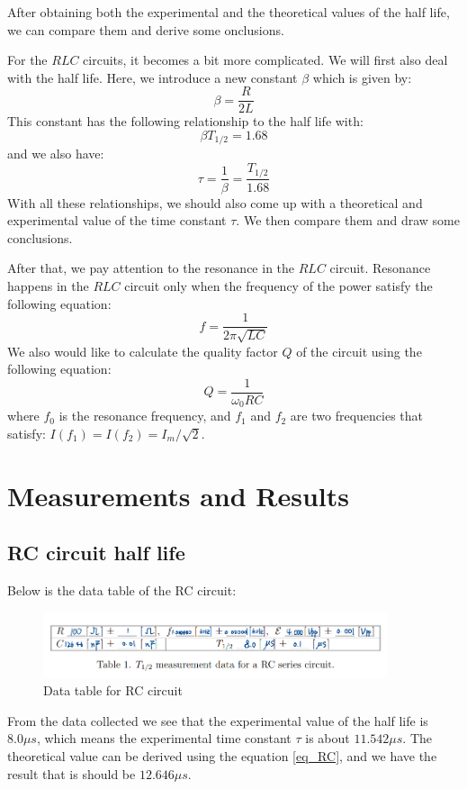 \documentclass[12pt, a4paper, oneside]{article}
\begin{document}
After obtaining both the experimental and the theoretical values of the half life, we can compare them and derive some onclusions. 

For the $RLC$ circuits, it becomes a bit more complicated. We will first also deal with the half life. Here, we introduce a new 
constant $\beta$ which is given by:
\begin{equation}
	\beta=\frac{R}{2L}
\end{equation}
This constant has the following relationship to the half life with:
\begin{equation}
	\beta T_{1/2}=1.68
\end{equation}
and we also have:
\begin{equation}
	\tau=\frac{1}{\beta}=\frac{T_{1/2}}{1.68}
	\label{eq_RLC}
\end{equation}
With all these relationships, we should also come up with a theoretical and experimental value of the time constant $\tau$. We then
compare them and draw some conclusions. 

After that, we pay attention to the resonance in the $RLC$ circuit. Resonance happens in the $RLC$ circuit only when the 
frequency of the power satisfy the following equation:
\begin{equation}
	f=\frac{1}{2\pi\sqrt{LC}}
	\label{eq_fre}
\end{equation}
We also would like to calculate the quality factor $Q$ of the circuit using the following equation:
\begin{equation}
	Q=\frac{1}{\omega_0 RC}
	\label{eq_Q}
\end{equation}
where $f_0$ is the resonance frequency, and $f_1$ and $f_2$ are two frequencies that satisfy: $I(f_1)=I(f_2)=I_m/\sqrt{2}$.

\section{Measurements and Results}
\subsection{RC circuit half life}
\indent

Below is the data table of the RC circuit:
\begin{figure}[htbp]
	\centering
	\includegraphics[width=0.9\textwidth]{C1.png}
	\caption{Data table for RC circuit}
\end{figure}
From the data collected we see that the experimental value of the half life is $8.0\mu s$, which means the experimental time constant
$\tau$ is about $11.542\mu s$. The theoretical value can be derived using the equation \ref{eq_RC}, and we have the result that is should
be $12.646\mu s$. 
\end{document}
